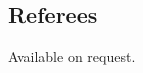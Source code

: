 \documentclass[line]{resume}
\begin{document}
\begin{resume}
    \section{\mysidestyle Referees} 

    Available on request.

\end{resume}
\end{document}
